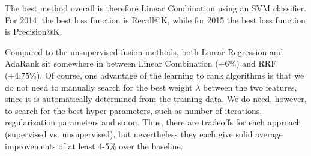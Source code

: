 \begin{table}[h!]
\centering
\caption{Comparison between best fusion methods.}
\label{fusion-comp}
\end{table}

The best method overall is therefore Linear Combination using an SVM classifier. For 2014, the best loss function
is Recall@K, while for 2015 the best loss function is Precision@K.

Compared to the unsupervised fusion methods, both Linear Regression and AdaRank sit somewhere in between
Linear Combination (+6\%) and RRF (+4.75\%). Of course, one advantage of the learning to rank algorithms
is that we do not need to manually search for the best weight $\lambda$ between the two features, 
since it is automatically determined
from the training data. 
We do need, however, to search for the best hyper-parameters, such as number of iterations, regularization
parameters and so on. Thus, there are tradeoffs for each approach (supervised vs. unsupervised), 
but nevertheless they each give solid average improvements of at least 4-5\% over the baseline.

